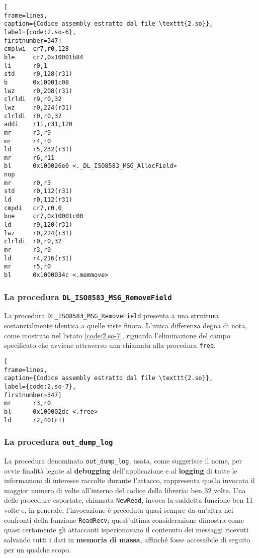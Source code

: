 \documentclass[10pt,a4paper, titlepage]{report}
\begin{document}
\begin{lstlisting}[
frame=lines, 
caption={Codice assembly estratto dal file \texttt{2.so}}, 
label={code:2.so-6},
firstnumber=347]
cmplwi  cr7,r0,128
ble     cr7,0x10001b84
li      r0,1
std     r0,128(r31)
b       0x10001c08
lwz     r0,208(r31)
clrldi  r9,r0,32
lwz     r0,224(r31)
clrldi  r0,r0,32
addi    r11,r31,120
mr      r3,r9
mr      r4,r0
ld      r5,232(r31)
mr      r6,r11
bl      0x100026e0 <._DL_ISO8583_MSG_AllocField>
nop
mr      r0,r3
std     r0,112(r31)
ld      r0,112(r31)
cmpdi   cr7,r0,0
bne     cr7,0x10001c00
ld      r9,120(r31)
lwz     r0,224(r31)
clrldi  r0,r0,32
mr      r3,r9
ld      r4,216(r31)
mr      r5,r0
bl      0x1000034c <.memmove>
\end{lstlisting}

\subsubsection{La procedura \texttt{DL\_ISO8583\_MSG\_RemoveField}}

La procedura \texttt{DL\_ISO8583\_MSG\_RemoveField} presenta a una struttura sostanzialmente identica a quelle viste finora. L'unica differenza degna di nota, come mostrato nel listato \ref{code:2.so-7}, riguarda l'eliminazione del campo specificato che avviene attraverso una chiamata alla procedura \texttt{free}.

\begin{lstlisting}[
frame=lines, 
caption={Codice assembly estratto dal file \texttt{2.so}}, 
label={code:2.so-7},
firstnumber=347]
mr      r3,r0
bl      0x100002dc <.free>
ld      r2,40(r1)
\end{lstlisting}

\subsubsection{La procedura \texttt{out\_dump\_log}}\label{subsubsection:outDumpLog}

La procedura denominata \texttt{out\_dump\_log}, usata, come suggerisce il nome, per ovvie finalità legate al \textbf{debugging} dell'applicazione e al \textbf{logging} di tutte le informazioni di interesse raccolte durante l'attacco, rappresenta quella invocata il maggior numero di volte all'interno del codice della libreria: ben 32 volte. Una delle procedure esportate, chiamata \texttt{NewRead}, invoca la suddetta funzione ben 11 volte e, in generale, l'invocazione è preceduta quasi sempre da un'altra nei confronti della funzione \texttt{ReadRecv}; quest'ultima considerazione dimostra come quasi certamente gli attaccanti ispezionavano il contenuto dei messaggi ricevuti salvando tutti i dati in \textbf{memoria di massa}, affinché fosse accessibile di seguito per un qualche scopo.
\end{document}
